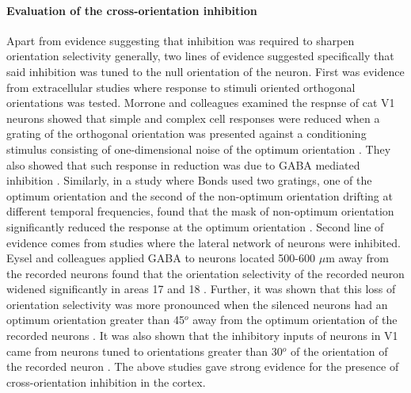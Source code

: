 \paragraph{Evaluation of the cross-orientation inhibition}

Apart from evidence suggesting that inhibition was required to sharpen orientation selectivity generally, two lines of evidence suggested specifically that said inhibition was tuned to the null orientation of the neuron. First was evidence from extracellular studies where response to stimuli oriented orthogonal orientations was tested. Morrone and colleagues examined the respnse of cat V1 neurons showed that simple and complex cell responses were reduced when a grating of the orthogonal orientation was presented against a conditioning stimulus consisting of one-dimensional noise of the optimum orientation \cite{Morrone1982}. They also showed that such response in reduction was due to GABA mediated inhibition \cite{Morrone1987}. Similarly, in a study where Bonds used two gratings, one of the optimum orientation and the second of the non-optimum orientation drifting at different temporal frequencies, found that the mask of non-optimum orientation significantly reduced the response at the optimum orientation \cite{Bonds1989}. Second line of evidence comes from studies where the lateral network of neurons were inhibited. Eysel and colleagues applied GABA to neurons located 500-600 $\mu$m away from the recorded neurons found that the orientation selectivity of the recorded neuron widened significantly in areas 17 and 18 \cite{Worgotter1988, Eysel1990, Crook1992}. Further, it was shown that this loss of orientation selectivity was more pronounced when the silenced neurons had an optimum orientation greater than 45$^o$ away from the optimum orientation of the recorded neurons \cite{Crook1992, Crook1997}. It was also shown that the inhibitory inputs of neurons in V1 came from neurons tuned to orientations greater than 30$^o$ of the orientation of the recorded neuron \cite{Kisvarday1997}. The above studies gave strong evidence for the presence of cross-orientation inhibition in the cortex.

